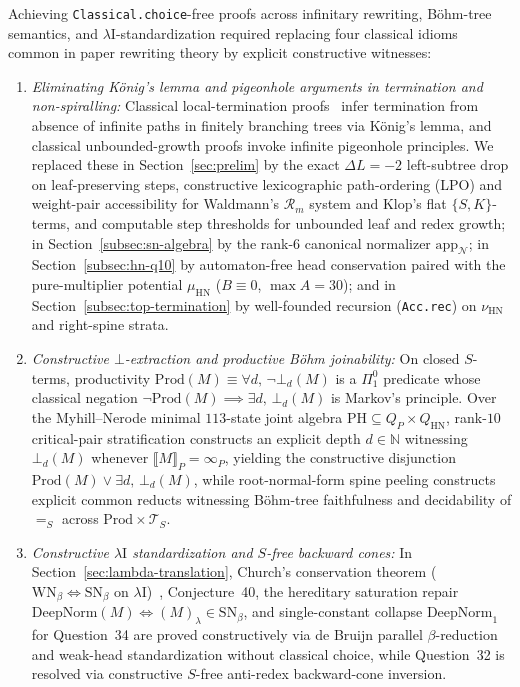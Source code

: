 \documentclass[11pt,reqno]{amsart}
\numberwithin{equation}{section}
\theoremstyle{plain}
\theoremstyle{definition}
\theoremstyle{remark}
\newcommand{\convS}{=_S}
\begin{document}
Achieving \texttt{Classical.choice}-free proofs across infinitary rewriting, B\"ohm-tree semantics, and $\lambda\mathrm{I}$-standardization required replacing four classical idioms common in paper rewriting theory by explicit constructive witnesses:
\begin{enumerate}[label=(\arabic*),leftmargin=2.2em]
\item \emph{Eliminating K\"onig's lemma and pigeonhole arguments in termination and non-spiralling:} Classical local-termination proofs~\cite{EndrullisDeVrijerWaldmann2010} infer termination from absence of infinite paths in finitely branching trees via K\"onig's lemma, and classical unbounded-growth proofs invoke infinite pigeonhole principles. We replaced these in Section~\ref{sec:prelim} by the exact $\Delta L = -2$ left-subtree drop on leaf-preserving steps, constructive lexicographic path-ordering (LPO) and weight-pair accessibility for Waldmann's $\mathcal{R}_m$ system and Klop's flat $\{S, K\}$-terms, and computable step thresholds for unbounded leaf and redex growth; in Section~\ref{subsec:sn-algebra} by the rank-$6$ canonical normalizer $\mathrm{app}_{\mathcal{N}}$; in Section~\ref{subsec:hn-q10} by automaton-free head conservation paired with the pure-multiplier potential $\mu_{\mathrm{HN}}$ ($B \equiv 0$, $\max A = 30$); and in Section~\ref{subsec:top-termination} by well-founded recursion (\texttt{Acc.rec}) on $\nu_{\mathrm{HN}}$ and right-spine strata.
\item \emph{Constructive $\bot$-extraction and productive B\"ohm joinability:} On closed $S$-terms, productivity $\mathrm{Prod}(M) \equiv \forall d,\, \neg\bot_d(M)$ is a $\Pi_1^0$ predicate whose classical negation $\neg\mathrm{Prod}(M) \implies \exists d,\, \bot_d(M)$ is Markov's principle. Over the Myhill--Nerode minimal $113$-state joint algebra $\mathrm{PH} \subseteq Q_P \times Q_{\mathrm{HN}}$, rank-$10$ critical-pair stratification constructs an explicit depth $d \in \mathbb{N}$ witnessing $\bot_d(M)$ whenever $\llbracket M \rrbracket_P = \infty_P$, yielding the constructive disjunction $\mathrm{Prod}(M) \vee \exists d,\, \bot_d(M)$, while root-normal-form spine peeling constructs explicit common reducts witnessing B\"ohm-tree faithfulness and decidability of $\convS$ across $\mathrm{Prod} \times \mathcal{T}_S$.
\item \emph{Constructive $\lambda\mathrm{I}$ standardization and $S$-free backward cones:} In Section~\ref{sec:lambda-translation}, Church's conservation theorem ($\mathrm{WN}_\beta \iff \mathrm{SN}_\beta$ on $\lambda\mathrm{I}$)~\cite{Church1941}, Conjecture~40, the hereditary saturation repair $\mathrm{DeepNorm}(M) \iff (M)_\lambda \in \mathrm{SN}_\beta$, and single-constant collapse $\mathrm{DeepNorm}_1$ for Question~34 are proved constructively via de Bruijn parallel $\beta$-reduction and weak-head standardization without classical choice, while Question~32 is resolved via constructive $S$-free anti-redex backward-cone inversion.

\end{enumerate}
\end{document}
